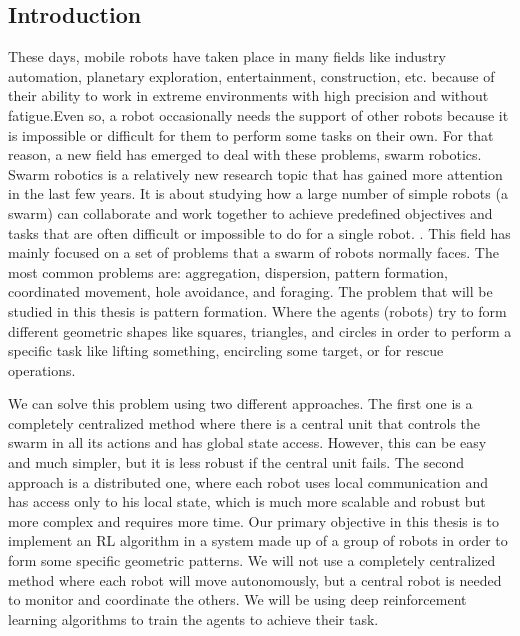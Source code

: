 \documentclass[12pt]{extarticle}
\begin{document}
\subsection{Introduction}
These days, mobile robots have taken place in many fields like industry automation, planetary exploration, entertainment, construction, etc. because of their ability to work in extreme environments with high precision and without fatigue\cite{rubio2019review}.Even so, a robot occasionally needs the support of other robots because it is impossible or difficult for them to perform some tasks on their own. For that reason, a new field has emerged to deal with these problems, swarm robotics.
Swarm robotics is a relatively new research topic that has gained more attention in the last few years. It is about studying how a large number of simple robots (a swarm) can collaborate and work together to achieve predefined objectives and tasks that are often difficult or impossible to do for a single robot. \cite{bayindir2016review}.
This field has mainly focused on a set of problems that a swarm of robots normally faces. The most common problems are: aggregation, dispersion, pattern formation, coordinated movement, hole avoidance, and foraging.
The problem that will be studied in this thesis is pattern formation. Where the agents (robots) try to form different geometric shapes like squares, triangles, and circles in order to perform a specific task like lifting something, encircling some target, or for rescue operations.

We can solve this problem using two different approaches. The first one is a completely centralized method where there is a central unit that controls the swarm in all its actions and has global state access. However, this can be easy and much simpler, but it is less robust if the central unit fails. The second approach is a distributed one, where each robot uses local communication and has access only to his local state, which is much more scalable and robust but more complex and requires more time. \cite{bayindir2007review}
Our primary objective in this thesis is to implement an RL algorithm in a system made up of a group of robots in order to form some specific geometric patterns. We will not use a completely centralized method where each robot will move autonomously, but a central robot is needed to monitor and coordinate the others. We will be using deep reinforcement learning algorithms to train the agents to achieve their task.
\end{document}
